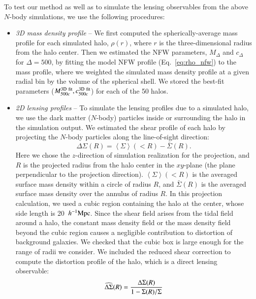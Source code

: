 \documentclass[iop, apj]{emulateapj}
\def\ave#1{\left\langle #1 \right\rangle}
\newcommand{\?}{\stackrel{?}{=}}
\begin{document}
To test our method as well as to simulate the lensing observables from
the above $N$-body simulations, we use the following procedures:
%
\begin{itemize}
 \item {\it 3D mass density profile} -- We first computed the
       spherically-average mass profile for each simulated halo,
       $\rho(r)$, where $r$ is the three-dimensional radius from the
       halo center. Then we estimated the NFW parameters, $M_\Delta$ and
       $c_\Delta$ for $\Delta=500$, by fitting the model NFW profile
       (Eq.~\ref{eq:rho_nfw}) to the mass profile, where we weighted the
       simulated mass density profile at a given radial bin by the
       volume of the spherical shell. We stored the best-fit parameters
       ($M^{\rm 3D~ fit}_{500c},c^{\rm 3D~ fit}_{500c}$) for each of the
       50 halos.
 \item {\it 2D lensing profiles} -- To simulate the lensing profiles due
       to a simulated halo, we use the dark matter ($N$-body) particles
       inside or surrounding the halo in the simulation output. We
       estimated the shear profile of each halo by projecting the
       $N$-body particles along the line-of-sight direction:
       \begin{equation}
	\Delta\Sigma(R)=\ave{\Sigma}(<R)-\bar{\Sigma}(R).
       \end{equation}
       Here we chose the $z$-direction of simulation realization for the
       projection, and $R$ is the projected radius from the halo center
       in the $xy$-plane (the plane perpendicular to the projection
       direction). $\ave{\Sigma}(<R)$ is the averaged surface mass
       density within a circle of radius $R$, and $\bar{\Sigma}(R)$ is
       the averaged surface mass density over the annulus of radius $R$.
       In this projection calculation, we used a cubic region containing
       the halo at the center, whose side length is 20~$h^{-1}{\rm
       Mpc}$. Since the shear field arises from the tidal field around a
       halo, the constant mass density field or the mass density field
       beyond the cubic region causes a negligible contribution to
       distortion of background galaxies. We checked that the cubic box
       is large enough for the range of radii we consider. We included
       the reduced shear correction to compute the distortion profile of
       the halo, which is a direct lensing observable:
       \begin{equation}
	\widehat{\Delta
	 \Sigma}(R)=\frac{\Delta\Sigma(R)}{1-\Sigma(R)/\Sigma_{\rm
}}
\end{equation}
\end{itemize}
\end{document}
